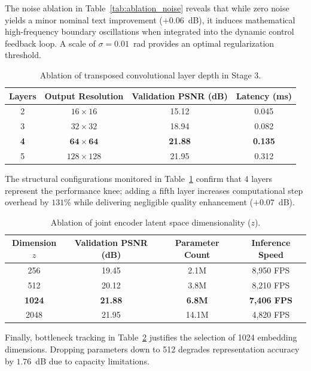 \documentclass[12pt,a4paper,oneside]{report}
\begin{document}
The noise ablation in Table~\ref{tab:ablation_noise} reveals that while zero noise yields a minor nominal text improvement ($+0.06$~dB), it induces mathematical high-frequency boundary oscillations when integrated into the dynamic control feedback loop. A scale of $\sigma = 0.01$~rad provides an optimal regularization threshold.

\begin{table}[H]
\centering
\caption{Ablation of transposed convolutional layer depth in Stage 3.}
\label{tab:ablation_layers}
\begin{tabular}{cccc}
\toprule
\textbf{Layers} & \textbf{Output Resolution} & \textbf{Validation PSNR (dB)} & \textbf{Latency (ms)} \\
\midrule
2 & $16 \times 16$ & 15.12 & 0.045 \\
3 & $32 \times 32$ & 18.94 & 0.082 \\
\textbf{4} & $\mathbf{64 \times 64}$ & \textbf{21.88} & \textbf{0.135} \\
5 & $128 \times 128$ & 21.95 & 0.312 \\
\bottomrule
\end{tabular}
\end{table}

The structural configurations monitored in Table~\ref{tab:ablation_layers} confirm that 4 layers represent the performance knee; adding a fifth layer increases computational step overhead by $131\%$ while delivering negligible quality enhancement ($+0.07$~dB).

\begin{table}[H]
\centering
\caption{Ablation of joint encoder latent space dimensionality ($z$).}
\label{tab:ablation_bottleneck}
\begin{tabular}{cccc}
\toprule
\textbf{Dimension $z$} & \textbf{Validation PSNR (dB)} & \textbf{Parameter Count} & \textbf{Inference Speed} \\
\midrule
256 & 19.45 & 2.1M & 8,950 FPS \\
512 & 20.12 & 3.8M & 8,210 FPS \\
\textbf{1024} & \textbf{21.88} & \textbf{6.8M} & \textbf{7,406 FPS} \\
2048 & 21.95 & 14.1M & 4,820 FPS \\
\bottomrule
\end{tabular}
\end{table}

Finally, bottleneck tracking in Table~\ref{tab:ablation_bottleneck} justifies the selection of 1024 embedding dimensions. Dropping parameters down to 512 degrades representation accuracy by $1.76$~dB due to capacity limitations.
\end{document}
